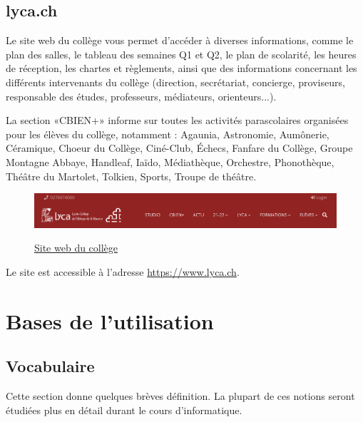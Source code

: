 \documentclass[10pt,a4paper]{report}
\begin{document}
\subsection{lyca.ch}

Le site web du collège vous permet d'accéder à diverses informations, comme le plan des salles, le tableau des semaines Q1 et Q2, le plan de scolarité, les heures de réception, les chartes et règlements, ainsi que des informations concernant les différents intervenants du collège (direction, secrétariat, concierge, proviseurs, responsable des études, professeurs, médiateurs, orienteurs...).

La section «CBIEN+» informe sur toutes les activités parascolaires organisées pour les élèves du collège, notamment : Agaunia, Astronomie, Aumônerie, Céramique, Choeur du Collège, Ciné-Club, Échecs, Fanfare du Collège, Groupe Montagne Abbaye, Handleaf, Iaïdo, Médiathèque, Orchestre, Phonothèque, Théâtre du Martolet, Tolkien, Sports, Troupe de théâtre.

\begin{figure}[H]
	\centering
	\href{https://www.lyca.ch}{
		\includegraphics[width=1\linewidth]{images/capture_lyca_ch.png}
	}
	\caption{\protect \href{https://www.lyca.ch}{Site web du collège}}
	\label{fig:capturelycach}
\end{figure}

Le site est accessible à l'adresse \href{https://www.lyca.ch}{https://www.lyca.ch}.



\section{Bases de l'utilisation}



\subsection{Vocabulaire}

Cette section donne quelques brèves définition. La plupart de ces notions seront étudiées plus en détail durant le cours d'informatique.
\end{document}
